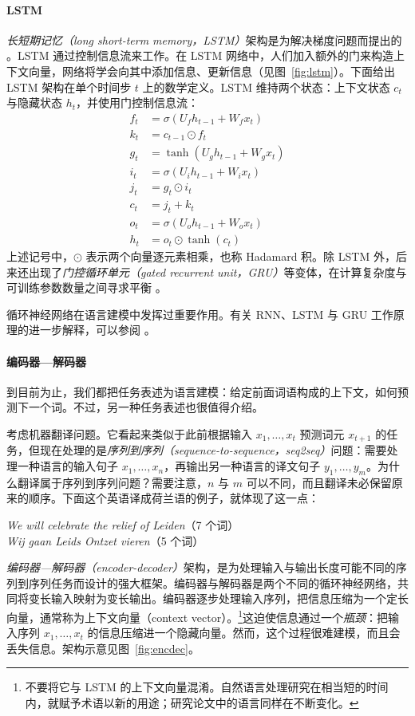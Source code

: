 \paragraph{LSTM} \emph{长短期记忆（long short-term memory，LSTM）}架构是为解决梯度问题而提出的 \citep{hochreiter1997long}。LSTM 通过控制信息流来工作。在 LSTM 网络中，人们加入额外的门来构造上下文向量，网络将学会向其中添加信息、更新信息（见图~\ref{fig:lstm}）。下面给出 LSTM 架构在单个时间步 $t$ 上的数学定义。LSTM 维持两个状态：上下文状态 $c_t$ 与隐藏状态 $h_t$，并使用门控制信息流：
\begin{align*}
    f_t &= \sigma(U_f h_{t-1} + W_f x_t) \\
    k_t &= c_{t-1} \odot f_t \\
    g_t &= \tanh(U_g h_{t-1} + W_g x_t) \\
    i_t &= \sigma(U_i h_{t-1} + W_i x_t) \\
    j_t &= g_t \odot i_t \\
    c_t &= j_t + k_t \\
    o_t &= \sigma(U_o h_{t-1} + W_o x_t) \\
    h_t &= o_t \odot \tanh(c_t)
\end{align*}
上述记号中，$\odot$ 表示两个向量逐元素相乘，也称 Hadamard 积。除 LSTM 外，后来还出现了\emph{门控循环单元（gated recurrent unit，GRU）}等变体，在计算复杂度与可训练参数数量之间寻求平衡 \citep{cho2014gated}。

循环神经网络在语言建模中发挥过重要作用。有关 RNN、LSTM 与 GRU 工作原理的进一步解释，可以参阅 \citet{olah2015understanding,bishop2023deep,goodfellow2014generative}。

\paragraph{编码器—解码器}
到目前为止，我们都把任务表述为语言建模：给定前面词语构成的上下文，如何预测下一个词。不过，另一种任务表述也很值得介绍。

考虑机器翻译问题。它看起来类似于此前根据输入 $x_1, \dots, x_t$ 预测词元 $x_{t+1}$ 的任务，但现在处理的是\emph{序列到序列（sequence-to-sequence，seq2seq）}问题：需要处理一种语言的输入句子 $x_1, \dots, x_n$，再输出另一种语言的译文句子 $y_1, \dots, y_m$。为什么翻译属于序列到序列问题？需要注意，$n$ 与 $m$ 可以不同，而且翻译未必保留原来的顺序。下面这个英语译成荷兰语的例子，就体现了这一点：
\begin{center}
    \emph{We will celebrate the relief of Leiden}（7 个词）\\[.5em]
    \emph{Wij gaan Leids Ontzet vieren}（5 个词）
\end{center}
\emph{编码器—解码器（encoder-decoder）}架构，是为处理输入与输出长度可能不同的序列到序列任务而设计的强大框架。编码器与解码器是两个不同的循环神经网络，共同将变长输入映射为变长输出。编码器逐步处理输入序列，把信息压缩为一个定长向量，通常称为上下文向量（context vector）。\footnote{不要将它与 LSTM 的上下文向量混淆。自然语言处理研究在相当短的时间内，就赋予术语以新的用途；研究论文中的语言同样在不断变化。}这迫使信息通过一个\emph{瓶颈}：把输入序列 $x_1, \dots, x_t$ 的信息压缩进一个隐藏向量。然而，这个过程很难建模，而且会丢失信息。架构示意见图~\ref{fig:encdec}。

